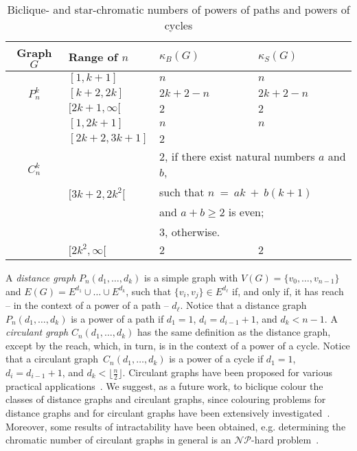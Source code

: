 \documentclass{article}
\begin{document}
\begin{table}[h]
\begin{center}
\begin{tabular}{|c||l|p{3cm}|p{3cm}|}
\hline
  Graph $G$ & Range of $n$ & $\kappa_B(G)$ & $\kappa_S(G)$ \\ \hline\hline
  \multirow{3}{*}{$P_{n}^{k}$} & $[1, k + 1]$ & $n$ & $n$ \\
  \cline{2-4}
   & $[k + 2, 2k]$ & $2k + 2 - n$ & $2k + 2 - n$\\
  \cline{2-4}
   & $[2k + 1, \infty[$ & $2$ & $2$ \\
  \hline\hline
  \multirow{5}{*}{$C_{n}^{k}$} & $[1, 2k + 1]$ & $n$ & $n$ \\
  \cline{2-4}
   & $[2k+2, 3k+1]$ & $2$ &\\
  \cline{2-3}
   & \multirow{4}{*}{$[3k + 2, 2k^2[$} & \multicolumn{2}{l|}{$2$, if there
   exist natural numbers $a$ and $b$,} \\
   & & \multicolumn{2}{l|}{such that $n~=~ak~+~b(k+1)$} \\
   & & \multicolumn{2}{l|}{and $a + b \geq 2$ is
   even;} \\
  & & \multicolumn{2}{l|}{$3$, otherwise.} \\
  \cline{2-4}
   & $[2k^2, \infty[$ & $2$ & $2$\\
  \hline
\end{tabular}
\caption{Biclique- and star-chromatic numbers of powers of paths and powers of cycles}
\label{t:tabela}
\end{center}
\end{table}

A \emph{distance graph} $P_n(d_1,\dots, d_k)$ is a simple graph with
$V(G)= \{v_0,\dots, v_{n-1}\}$ and $E(G)=E^{d_1}\cup\dots\cup E^{d_k}$, such
that $\{v_i,v_j\}\in E^{d_\ell}$ if, and only if, it has reach -- in the context
of a power of a path -- $d_\ell$. Notice that a distance graph
$P_n(d_1,\dots,d_k)$ is a power of a path if $d_1=1$, $d_i=d_{i-1}+1$, and
$d_k< n - 1$. A \emph{circulant graph} $C_n(d_1,\dots, d_k)$ has the same
definition as the distance graph, except by the reach, which, in turn, is in
the context of a power of a cycle. Notice that a circulant
graph~$C_n(d_1,\dots,d_k)$ is a power of a cycle if $d_1=1$, $d_i=d_{i-1}+1$,
and $d_k< \lfloor \frac{n}{2} \rfloor$.
Circulant graphs have been proposed for various practical
applications~\cite{circulantgraphapplication}.
We suggest, as a future work, to biclique colour the classes of distance
graphs and circulant graphs, since colouring problems for distance graphs and
for circulant graphs have been extensively
investigated~\cite{MR2567972,MR1900685,MR1632015}.
Moreover, some results of intractability have been obtained, e.g. determining
the chromatic number of circulant graphs in general is an $\mathcal{NP}$-hard
problem~\cite{MR1653503}.
\end{document}
